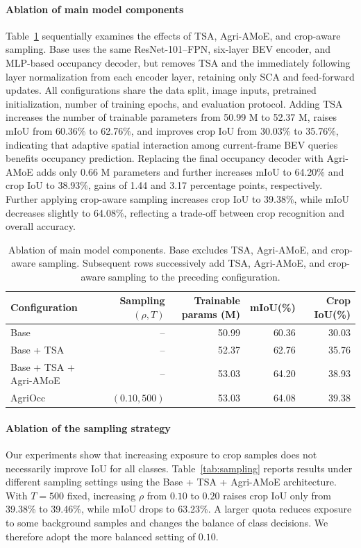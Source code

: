 \documentclass[a4paper,fleqn]{cas-sc}
\begin{document}
\paragraph{Ablation of main model components}
Table~\ref{tab:ablation} sequentially examines the effects of TSA, Agri-AMoE, and crop-aware sampling.
Base uses the same ResNet-101--FPN, six-layer BEV encoder, and MLP-based occupancy decoder, but removes TSA and the immediately following layer normalization from each encoder layer, retaining only SCA and feed-forward updates.
All configurations share the data split, image inputs, pretrained initialization, number of training epochs, and evaluation protocol.
Adding TSA increases the number of trainable parameters from 50.99 M to 52.37 M, raises mIoU from 60.36\% to 62.76\%, and improves crop IoU from 30.03\% to 35.76\%, indicating that adaptive spatial interaction among current-frame BEV queries benefits occupancy prediction.
Replacing the final occupancy decoder with Agri-AMoE adds only 0.66 M parameters and further increases mIoU to 64.20\% and crop IoU to 38.93\%, gains of 1.44 and 3.17 percentage points, respectively.
Further applying crop-aware sampling increases crop IoU to 39.38\%, while mIoU decreases slightly to 64.08\%, reflecting a trade-off between crop recognition and overall accuracy.

\begin{table}[pos=htbp]
\centering
\caption{Ablation of main model components. Base excludes TSA, Agri-AMoE, and crop-aware sampling. Subsequent rows successively add TSA, Agri-AMoE, and crop-aware sampling to the preceding configuration.}
\label{tab:ablation}
\begin{tabular}{lrrrr}
\toprule
Configuration & Sampling $(\rho,T)$ & Trainable params (M) & mIoU(\%) & Crop IoU(\%)\\
\midrule
Base & -- & 50.99 & 60.36 & 30.03\\
Base + TSA & -- & 52.37 & 62.76 & 35.76\\
Base + TSA + Agri-AMoE & -- & 53.03 & 64.20 & 38.93\\
AgriOcc & $(0.10,500)$ & 53.03 & 64.08 & 39.38\\
\bottomrule
\end{tabular}
\end{table}

\paragraph{Ablation of the sampling strategy}
Our experiments show that increasing exposure to crop samples does not necessarily improve IoU for all classes.
Table~\ref{tab:sampling} reports results under different sampling settings using the Base + TSA + Agri-AMoE architecture.
With $T=500$ fixed, increasing $\rho$ from $0.10$ to $0.20$ raises crop IoU only from 39.38\% to 39.46\%, while mIoU drops to 63.23\%.
A larger quota reduces exposure to some background samples and changes the balance of class decisions. We therefore adopt the more balanced setting of $0.10$.
\end{document}
